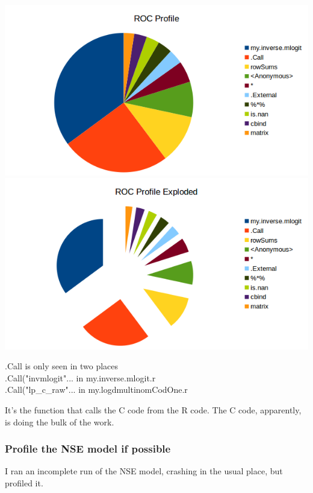 \documentclass[11pt]{article} %
\begin{document}
\includegraphics{data/ROC_Profile}
\includegraphics{data/ROC_Profilexplode}

.Call is only seen in two places\\
.Call("invmlogit"... in my.inverse.mlogit.r\\
.Call("lp\_c\_raw"... in my.logdmultinomCodOne.r

It's the function that calls the C code from the R code. The C code, apparently, is doing the bulk of the work.


\subsubsection{Profile the NSE model if possible}

I ran an incomplete run of the NSE model, crashing in the usual place, but profiled it.


\end{document}
